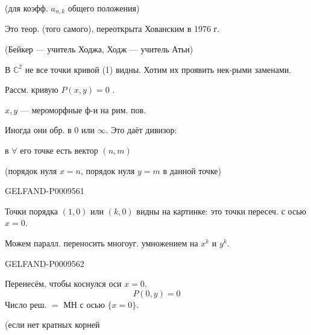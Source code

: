 (для коэфф. $a_{n,k}$ общего положения)

Это теор.  (того самого), переоткрыта Хованским в 1976 г.

(Бейкер --- учитель Ходжа, Ходж --- учитель Атьи)

В $\mathbb C^2$ не все точки кривой (1) видны. Хотим их проявить нек-рыми заменами.

Рассм. кривую $P(x,y)=0$ .

$x,y$ --- мероморфные ф-и на рим. пов.

Иногда они обр. в $0$ или $\infty$. Это даёт дивизор:

в $\forall$ его точке есть вектор $(n,m)$

(порядок нуля $x=n$, порядок нуля $y=m$ в данной точке)

\begin{GelfandAdjacentEvidence}{GELFAND-P000956}{1}

Точки порядка $(1,0)$ или $(k,0)$ видны на картинке: это точки пересеч. с осью \underline{$x=0$}.

Можем паралл. переносить многоуг. умножением на $x^k$ и $y^k$.

\end{GelfandAdjacentEvidence}
\begin{GelfandAdjacentEvidence}{GELFAND-P000956}{2}


Перенесём, чтобы коснулся оси $x=0$.
\begin{equation*}
 P(0,y)=0
 \tag{6}
\end{equation*}
Число реш. $=$  МН с осью $\{x=0\}$.

(если нет кратных корней

\end{GelfandAdjacentEvidence}
